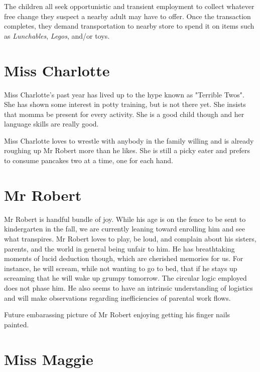 \documentclass[letterpaper,11pt]{article}
\makeatletter
\newenvironment{figurehere}
  {\def\@captype{figure}}
  {}
\makeatother
\begin{document}
\begin{multicols}{2}
The children all seek opportunistic and transient employment to collect whatever
free change they suspect a nearby adult may have to offer.  Once the transaction
completes, they demand transportation to nearby store to spend it on items such
as \textit{Lunchables}, \textit{Legos}, and/or toys.

\section{Miss Charlotte}

Miss Charlotte's past year has lived up to the hype known as "Terrible Twos". She
has shown some interest in potty training, but is not there yet.  She insists that
momma be present for every activity.  She is a good child though and her language
skills are really good.

Miss Charlotte loves to wrestle with anybody in the family willing and is already
roughing up Mr Robert more than he likes.  She is still a picky eater and prefers
to consume pancakes two at a time, one for each hand.

\section{Mr Robert}

Mr Robert is handful bundle of joy.  While his age is on the fence to be sent
to kindergarten in the fall, we are currently leaning toward enrolling him and
see what transpires. Mr Robert loves to play, be loud, and complain about his sisters,
parents, and the world in general being unfair to him.  He has breathtaking moments of
lucid deduction though, which are cherished memories for us.  For instance, he will
scream, while not wanting to go to bed, that if he stays up screaming that he will 
wake up grumpy tomorrow. The circular logic employed does not phase him.
He also seems to have an intrinsic understanding of
logistics and will make observations regarding inefficiencies of parental
work flows.

\bigskip

\begin{figurehere}
 \centering   
 \caption{Future embarassing picture of Mr Robert enjoying getting his finger nails painted.}
\end{figurehere}

\bigskip

\section{Miss Maggie}


\end{multicols}
\end{document}

